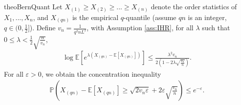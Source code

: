 


\begin{restatable}{theo}{BernQuant}
\label{theo: Bernstein Inequality for Quantiles.}
Let $X_{\left(1\right)} \geq X_{\left(2\right)} \geq ... \geq X_{\left(n\right)}$ denote the order statistics of $X_1, ..., X_n$, and $X_{(qn)}$ is the empirical $q$-quantile (assume $qn$ is an integer, $q \in (0, \frac{1}{2}]$).
Define $v_n = \frac{1}{q^2 n L^2}$, with Assumption \ref{ass:IHR},
for all $\lambda$ such that $0 \leq \lambda< \frac{1}{2} \sqrt{\frac{n}{v_n}}$,
\begin{align}
    \label{equ: log mgf for quantile}
    \log \mathbb{E}\left[e^{\lambda\left(X_{\left(qn\right)}-\mathbb{E}[X_{\left(qn\right)}] \right)}\right] \leq  \frac{\lambda^{2}  v_{n}}{2 \left(1-2 \lambda \sqrt{\frac{v_{n}}{n}}\right)}.
\end{align}
For all $\varepsilon > 0$, we obtain the concentration inequality
\begin{align}
    \label{equ: bernstein ineq for quantile}
    \mathbb{P}\left(X_{\left(qn\right)}-\mathbb{E}[X_{\left(qn\right)}] \geq \sqrt{2 v_{n} \varepsilon}+2 \varepsilon \sqrt{\frac{v_{n}}{n}}\right) \leq e^{-\varepsilon}.
\end{align}
\end{restatable}

